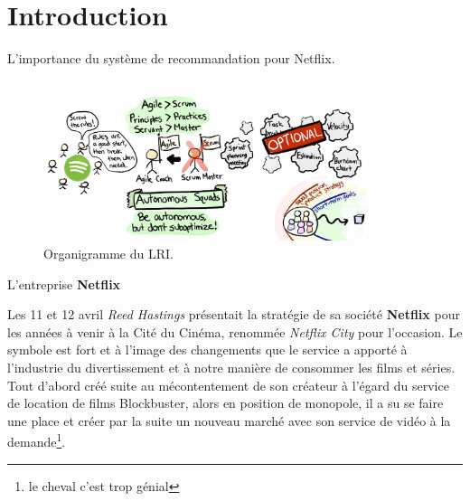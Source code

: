 \chapter*{Introduction}
\label{chap:introduction}

L’importance du système de recommandation pour Netflix.

\vspace{5mm}

\begin{figure}[htp]
  \centering
  \includegraphics[width=95mm]{./src_img/agile_scrum}
  \caption{Organigramme du LRI.}
  \label{fig:uno}
\end{figure}

\vspace{5mm}

L'entreprise \textbf{Netflix} \supercite{NetflixNumerama} 

\vspace{5mm}



\vspace{5mm}

Les 11 et 12 avril \textit{Reed Hastings} présentait la stratégie de sa société \textbf{Netflix} pour les années à venir à la Cité du Cinéma, renommée \textit{Netflix City} pour l'occasion. Le symbole est fort et à l'image des changements que le service a apporté à l'industrie du divertissement et à notre manière de consommer les films et séries. Tout d'abord créé suite au mécontentement de son créateur à l'égard du service de location de films Blockbuster, alors en position de monopole, il a su se faire une place et créer par la suite un nouveau marché avec son service de vidéo à la demande\footnote{le cheval c'est trop génial}.

\vspace{5mm}
 